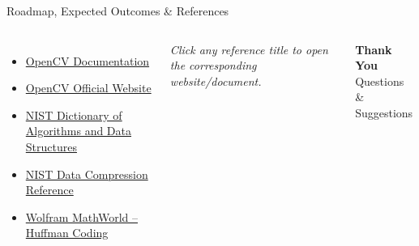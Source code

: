 \documentclass[aspectratio=169,11pt]{beamer}
\begin{document}
\begin{frame}{Roadmap, Expected Outcomes \& References}
\begin{columns}[T,totalwidth=\textwidth]
\begin{itemize}
\setlength{\itemsep}{1pt}

\tiny

\item
\href{
https://docs.opencv.org/4.x/
}{
OpenCV Documentation
}

\item
\href{
https://opencv.org/
}{
OpenCV Official Website
}

\item
\href{
https://www.nist.gov/dads/
}{
NIST Dictionary of Algorithms and Data Structures
}

\item
\href{
https://nvlpubs.nist.gov/nistpubs/Legacy/SP/nbsspecialpublication500-12.pdf
}{
NIST Data Compression Reference
}

\item
\href{
https://mathworld.wolfram.com/HuffmanCoding.html
}{
Wolfram MathWorld -- Huffman Coding
}

\end{itemize}

\vspace{0.3mm}

{\scriptsize
\color{GEUGrey}
\textit{
Click any reference title to open the corresponding website/document.
}
}

\vfill

\begin{center}

\colorbox{GEUBlue}
{
\parbox{.78\textwidth}
{
\centering
\color{white}
\textbf{Thank You}
\\
Questions \& Suggestions
}
}

\end{center}

\end{columns}

\end{frame}
\end{document}
